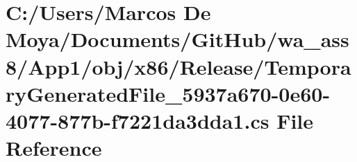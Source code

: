 \hypertarget{_app1_2obj_2x86_2_release_2_temporary_generated_file__5937a670-0e60-4077-877b-f7221da3dda1_8cs}{}\section{C\+:/\+Users/\+Marcos De Moya/\+Documents/\+Git\+Hub/wa\+\_\+ass8/\+App1/obj/x86/\+Release/\+Temporary\+Generated\+File\+\_\+5937a670-\/0e60-\/4077-\/877b-\/f7221da3dda1.cs File Reference}
\label{_app1_2obj_2x86_2_release_2_temporary_generated_file__5937a670-0e60-4077-877b-f7221da3dda1_8cs}
